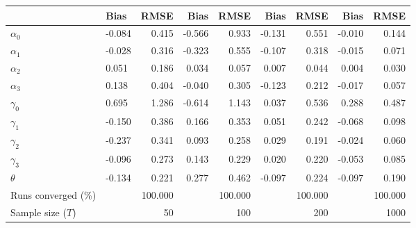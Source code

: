 
\begin{tabular}[t]{llrrrrrrr}
\toprule
  & Bias & RMSE & Bias & RMSE & Bias & RMSE & Bias & RMSE\\
\midrule
$\alpha_{0}$ & -0.084 & 0.415 & -0.566 & 0.933 & -0.131 & 0.551 & -0.010 & 0.144\\
$\alpha_{1}$ & -0.028 & 0.316 & -0.323 & 0.555 & -0.107 & 0.318 & -0.015 & 0.071\\
$\alpha_{2}$ & 0.051 & 0.186 & 0.034 & 0.057 & 0.007 & 0.044 & 0.004 & 0.030\\
$\alpha_{3}$ & 0.138 & 0.404 & -0.040 & 0.305 & -0.123 & 0.212 & -0.017 & 0.057\\
$\gamma_{0}$ & 0.695 & 1.286 & -0.614 & 1.143 & 0.037 & 0.536 & 0.288 & 0.487\\
$\gamma_{1}$ & -0.150 & 0.386 & 0.166 & 0.353 & 0.051 & 0.242 & -0.068 & 0.098\\
$\gamma_{2}$ & -0.237 & 0.341 & 0.093 & 0.258 & 0.029 & 0.191 & -0.024 & 0.060\\
$\gamma_{3}$ & -0.096 & 0.273 & 0.143 & 0.229 & 0.020 & 0.220 & -0.053 & 0.085\\
$\theta$ & -0.134 & 0.221 & 0.277 & 0.462 & -0.097 & 0.224 & -0.097 & 0.190\\
Runs converged (\%) &  & 100.000 &  & 100.000 &  & 100.000 &  & 100.000\\
Sample size ($T$) &  & 50 &  & 100 &  & 200 &  & 1000\\
\bottomrule
\end{tabular}
